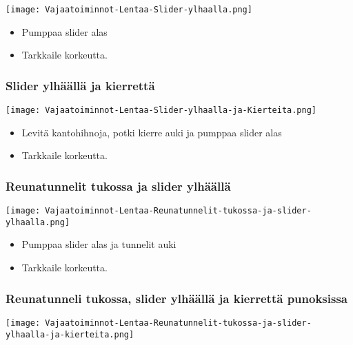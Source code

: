\begin{Figure}\centering\texttt{[image: Vajaatoiminnot-Lentaa-Slider-ylhaalla.png]}\end{Figure} 

\begin{itemize}
\item  Pumppaa slider alas 
\item  Tarkkaile korkeutta. 
\end{itemize}
\subsubsection{Slider ylhäällä ja kierrettä}
\label{paavarjon-vajaatoiminnot-slider-ylhaalla-ja-kierretta}


\begin{Figure}\centering\texttt{[image: Vajaatoiminnot-Lentaa-Slider-ylhaalla-ja-Kierteita.png]}\end{Figure} 

\begin{itemize}
\item  Levitä kantohihnoja, potki kierre auki ja pumppaa slider alas 
\item  Tarkkaile korkeutta. 
\end{itemize}
\subsubsection{Reunatunnelit tukossa ja slider ylhäällä}
\label{paavarjon-vajaatoiminnot-reunatunnelit-tukossa-ja-slider-ylhaalla}


\begin{Figure}\centering\texttt{[image: Vajaatoiminnot-Lentaa-Reunatunnelit-tukossa-ja-slider-ylhaalla.png]}\end{Figure} 

\begin{itemize}
\item  Pumppaa slider alas ja tunnelit auki 
\item  Tarkkaile korkeutta. 
\end{itemize}
\subsubsection{Reunatunneli tukossa, slider ylhäällä ja kierrettä punoksissa}
\label{paavarjon-vajaatoiminnot-reunatunneli-tukossa-slider-ylhaalla-ja-kierretta-punoksissa}


\begin{Figure}\centering\texttt{[image: Vajaatoiminnot-Lentaa-Reunatunnelit-tukossa-ja-slider-ylhaalla-ja-kierteita.png]}\end{Figure} 

